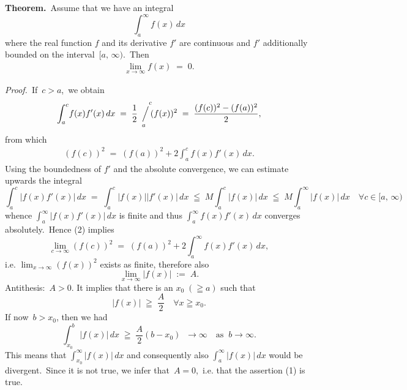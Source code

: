 \documentclass[12pt]{article}
\newcommand{\sijoitus}[2]%
{\operatornamewithlimits{\Big/}_{\!\!\!#1}^{\,#2}}
\begin{document}
\textbf{Theorem.}\, Assume that we have an  integral
$$\int_a^\infty\!f(x)\,dx$$
where the real function $f$ and its derivative $f'$ are continuous and $f'$ additionally bounded on the interval 
\,$[a,\,\infty)$.\, Then
\begin{align}
\lim_{x\to\infty}f(x) \;=\; 0.
\end{align}



\emph{Proof.}\, If\, $c > a$,\, we obtain
$$\int_a^c\!f(x)f'(x)\,dx \;=\; \frac{1}{2}\sijoitus{a}{\quad c}\!(f(x))^2 
\;=\; \frac{(f(c))^2-(f(a))^2}{2},$$
from which
\begin{align}
(f(c))^2 \;=\; (f(a))^2+2\!\int_a^c\!f(x)f'(x)\,dx.
\end{align}
Using the boundedness of $f'$ and the absolute convergence, we can estimate upwards the integral
$$\int_a^c\!|f(x)f'(x)|\,dx \;=\; \int_a^c\!|f(x)||f'(x)|\,dx \;\leqq\; M\!\int_a^c\!|f(x)|\,dx 
\;\leqq\; M\!\int_a^\infty\!|f(x)|\,dx \quad \forall c \in [a,\,\infty)$$
whence $\int_a^\infty\!|f(x)f'(x)|\,dx$ is finite and thus $\int_a^\infty\!f(x)f'(x)\,dx$ converges absolutely.\, Hence (2) implies
$$\lim_{c\to\infty}(f(c))^2 \;=\; (f(a))^2+2\int_a^\infty\!f(x)f'(x)\,dx,$$
i.e. $\displaystyle\lim_{x\to\infty}(f(x))^2$ exists as finite, therefore also
$$\lim_{x\to\infty}|f(x)| \;:=\; A.$$
Antithesis:\, $A > 0$.\; It implies that there is an $x_0\;(\geqq a)$ such that 
$$|f(x)| \;\geqq\; \frac{A}{2} \quad \forall x \geqq x_0.$$
If now\, $b > x_0$, then we had
$$\int_{x_0}^b\!|f(x)|\,dx \;\geqq\; \frac{A}{2}(b\!-\!x_0) \;\; \longrightarrow \infty \quad \mbox{as}\;\; b \to \infty.$$
This means that $\int_{x_0}^\infty|f(x)|\,dx$ and consequently also $\int_a^\infty|f(x)|\,dx$ would be divergent.\, Since it is not true, we infer that\, $A = 0$,\, i.e. that the assertion (1) is true. 

\end{document}
